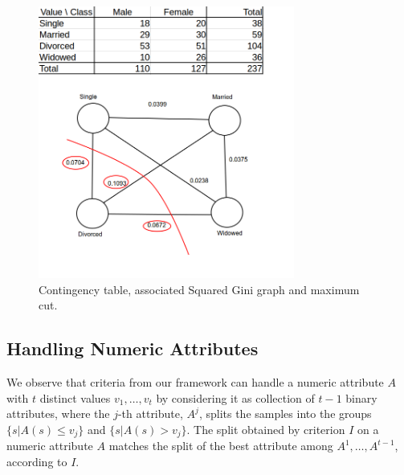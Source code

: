 \begin{figure}[h]
\centering
\includegraphics[width=0.75\textwidth]{cut-example2}
\caption{Contingency table, associated Squared Gini graph and maximum cut.}
\label{fig:cut-example}
\end{figure}

\subsection{Handling Numeric Attributes}
We observe  that criteria from our framework can handle
 a numeric attribute $A$ with $t$ distinct values
$v_1,\ldots,v_t$
by considering it as collection of 
$t-1$ binary attributes, where the
$j$-th attribute, $A^j$,  splits the samples into the
groups $\{s | A(s) \le v_j \}$ and $\{s | A(s) > v_j \}$. 
The split  obtained by criterion $I$ on a numeric attribute
$A$ matches the split of  the best attribute 
among $A^1,\ldots,A^ {t-1}$, according to $I$.
